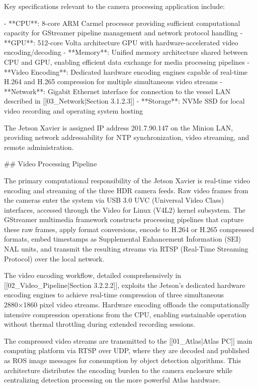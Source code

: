 \documentclass{erauthesis}
\begin{document}
Key specifications relevant to the camera processing application include:

- **CPU**: 8-core ARM Carmel processor providing sufficient computational capacity for GStreamer pipeline management and network protocol handling
- **GPU**: 512-core Volta architecture GPU with hardware-accelerated video encoding/decoding
- **Memory**: Unified memory architecture shared between CPU and GPU, enabling efficient data exchange for media processing pipelines
- **Video Encoding**: Dedicated hardware encoding engines capable of real-time H.264 and H.265 compression for multiple simultaneous video streams
- **Network**: Gigabit Ethernet interface for connection to the vessel LAN described in [[03_Network|Section 3.1.2.3]]
- **Storage**: NVMe SSD for local video recording and operating system hosting

The Jetson Xavier is assigned IP address 201.7.90.147 on the Minion LAN, providing network addressability for NTP synchronization, video streaming, and remote administration.

## Video Processing Pipeline

The primary computational responsibility of the Jetson Xavier is real-time video encoding and streaming of the three HDR camera feeds. Raw video frames from the cameras enter the system via USB 3.0 UVC (Universal Video Class) interfaces, accessed through the Video for Linux (V4L2) kernel subsystem. The GStreamer multimedia framework constructs processing pipelines that capture these raw frames, apply format conversions, encode to H.264 or H.265 compressed formats, embed timestamps as Supplemental Enhancement Information (SEI) NAL units, and transmit the resulting streams via RTSP (Real-Time Streaming Protocol) over the local network.

The video encoding workflow, detailed comprehensively in [[02_Video_Pipeline|Section 3.2.2.2]], exploits the Jetson's dedicated hardware encoding engines to achieve real-time compression of three simultaneous 2880×1860 pixel video streams. Hardware encoding offloads the computationally intensive compression operations from the CPU, enabling sustainable operation without thermal throttling during extended recording sessions.

The compressed video streams are transmitted to the [[01_Atlas|Atlas PC]] main computing platform via RTSP over UDP, where they are decoded and published as ROS image messages for consumption by object detection algorithms. This architecture distributes the encoding burden to the camera enclosure while centralizing detection processing on the more powerful Atlas hardware.
\end{document}
